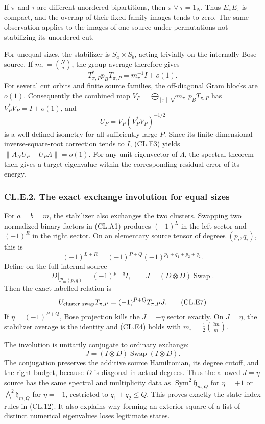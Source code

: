 If \(\pi\) and \(\tau\) are different unordered bipartitions, then \(\pi\vee\tau=1_N\). Thus \(E_\pi E_\tau\) is compact, and the overlap of their fixed-family images tends to zero. The same observation applies to the images of one source under permutations not stabilizing its unordered cut.

For unequal sizes, the stabilizer is \(S_a\times S_b\), acting trivially on the internally Bose source. If \(m_\pi=\binom Na\), the group average therefore gives \[
T_{\pi,P}^*p_BT_{\pi,P}=m_\pi^{-1}I+o(1).
\tag{CL.E4}
\] For several cut orbits and finite source families, the off-diagonal Gram blocks are \(o(1)\). Consequently the combined map \(V_P=\bigoplus_{[\pi]}\sqrt{m_\pi}\,p_BT_{\pi,P}\) has \(V_P^*V_P=I+o(1)\), and \[
U_P=V_P(V_P^*V_P)^{-1/2}
\tag{CL.E5}
\] is a well-defined isometry for all sufficiently large \(P\). Since its finite-dimensional inverse-square-root correction tends to \(I\), (CL.E3) yields \(\|A_NU_P-U_P\Lambda\|=o(1)\). For any unit eigenvector of \(\Lambda\), the spectral theorem then gives a target eigenvalue within the corresponding residual error of its energy.

\hypertarget{cl.e.2.-the-exact-exchange-involution-for-equal-sizes}{%
\subsubsection{CL.E.2. The exact exchange involution for equal sizes}\label{cl.e.2.-the-exact-exchange-involution-for-equal-sizes}}

For \(a=b=m\), the stabilizer also exchanges the two clusters. Swapping two normalized binary factors in (CL.A1) produces \((-1)^L\) in the left sector and \((-1)^R\) in the right sector. On an elementary source tensor of degrees \((p_i,q_i)\), this is \[
(-1)^{L+R}=(-1)^{P+Q}(-1)^{p_1+q_1+p_2+q_2}.
\] Define on the full internal source \[
D|_{\mathcal P_m(p,q)}=(-1)^{p+q}I,\qquad
J=(D\otimes D)\operatorname{Swap}.
\tag{CL.E6}
\] Then the exact labelled relation is \[
U_{\rm cluster\ swap}T_{\pi,P}
=(-1)^{P+Q}T_{\pi,P}J.
\tag{CL.E7}
\] If \(\eta=(-1)^{P+Q}\), Bose projection kills the \(J=-\eta\) sector exactly. On \(J=\eta\), the stabilizer average is the identity and (CL.E4) holds with \(m_\pi=\frac12\binom{2m}{m}\).

The involution is unitarily conjugate to ordinary exchange: \[
J=(I\otimes D)\operatorname{Swap}(I\otimes D).
\tag{CL.E8}
\] The conjugation preserves the additive source Hamiltonian, its degree cutoff, and the right budget, because \(D\) is diagonal in actual degrees. Thus the allowed \(J=\eta\) source has the same spectral and multiplicity data as \(\operatorname{Sym}^2\mathfrak h_{m,Q}\) for \(\eta=+1\) or \(\bigwedge^2\mathfrak h_{m,Q}\) for \(\eta=-1\), restricted to \(q_1+q_2\leq Q\). This proves exactly the state-index rules in (CL.12). It also explains why forming an exterior square of a list of distinct numerical eigenvalues loses legitimate states.

